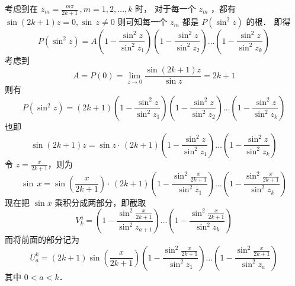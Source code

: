 考虑到在 $z_m=\frac{m\pi}{2k+1}\,,m=1,2,\dots,k $ 时， 对于每一个 $z_m$ ，都有 $ \sin(2k+1)z=0,\sin\,z\ne 0$
则可知每一个 $z_m$ 都是 $P(\sin^2z)$ 的根． 即得
\begin{equation}
P(\sin^2z)=A(1-\frac{\sin^2z}{\sin^2z_1})(1-\frac{\sin^2z}{\sin^2z_2})\dots(1-\frac{\sin^2z}{\sin^2z_k})
\end{equation}
考虑到
\begin{equation}
A=P(0)=\lim_{z\rightarrow0}\frac{\sin(2k+1)z}{\sin z}=2k+1
\end{equation}
则有
\begin{equation}
P(\sin^2z)=(2k+1)(1-\frac{\sin^2z}{\sin^2z_1})(1-\frac{\sin^2z}{\sin^2z_2})\dots(1-\frac{\sin^2z}{\sin^2z_k})
\end{equation}
也即
\begin{equation}
\sin(2k+1)z=\sin z\cdot\,(2k+1)(1-\frac{\sin^2z}{\sin^2z_1})\dots(1-\frac{\sin^2z}{\sin^2z_k})
\end{equation}
令 $z=\frac{x}{2k+1}$，则为
\begin{equation}
\sin\,x=\sin(\frac x{2k+1})\cdot\,(2k+1)(1-\frac{\sin^2\frac x{2k+1}}{\sin^2z_1})\dots(1-\frac{\sin^2\frac x{2k+1}}{\sin^2z_k})
\end{equation}
现在把 $\sin x$ 乘积分成两部分，即截取
\begin{equation}
V^a_k=(1-\frac{\sin^2\frac x{2k+1}}{\sin^2z_{a+1}})\dots(1-\frac{\sin^2\frac x{2k+1}}{\sin^2z_k})
\end{equation}
而将前面的部分记为
\begin{equation}
U^k_a=(2k+1)\sin(\frac x{2k+1})(1-\frac{\sin^2\frac x{2k+1}}{\sin^2z_1})\dots(1-\frac{\sin^2\frac x{2k+1}}{\sin^2z_{a}})
\end{equation}
其中 $0<a<k $．

